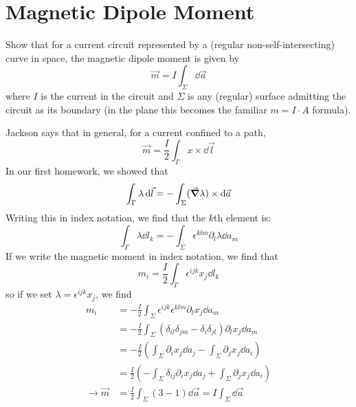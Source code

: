 \documentclass[a4paper,twoside]{article}
\begin{document}
\section{Magnetic Dipole Moment}
Show that for a current circuit represented by a (regular non-self-intersecting) curve in space, the magnetic dipole moment is given by
\begin{equation}
    \vec{m} = I \int_{\Sigma} \dd{ \vec{a}}
\end{equation}
where $ I $ is the current in the circuit and $ \Sigma $ is any (regular) surface admitting the circuit as its boundary (in the plane this becomes the familiar $ m = I \cdot A $ formula).
\begin{problem}
    Jackson says that in general, for a current confined to a path,
    \begin{equation}
        \vec{m} = \frac{I}{2} \int_{\Gamma} x \times \dd{ \vec{l}}
    \end{equation}
    In our first homework, we showed that
    \begin{equation}
        \int_{\Gamma} \lambda \dd{ \vec{l}} = -\int_{\Sigma} (\grad{\lambda}) \times \dd{ \vec{a}}
    \end{equation}
    Writing this in index notation, we find that the $ k $th element is:
    \begin{equation}
        \int_\Gamma \lambda \dd{l_k} = -\int_\Sigma \epsilon^{klm}\partial_l\lambda \dd{a_m}
    \end{equation}
    If we write the magnetic moment in index notation, we find that
    \begin{equation}
        m_i = \frac{I}{2} \int_\Gamma \epsilon^{ijk}x_j \dd{l_k}
    \end{equation}
    so if we set $ \lambda = \epsilon^{ijk}x_j $, we find
    \begin{align}
        m_i &= - \frac{I}{2} \int_\Sigma \epsilon^{ijk} \epsilon^{klm} \partial_l x_j \dd{a_m}\\
        &= - \frac{I}{2} \int_\Sigma (\delta_{il} \delta_{jm} - \delta_{\imath} \delta_{jl}) \partial_l x_j \dd{a_m}\\
        &= - \frac{I}{2} \left(\int_\Sigma \partial_i x_j \dd{a_j} - \int_\Sigma \partial_j x_j \dd{a_i} \right)\\
        &= \frac{I}{2} \left( -\int_\Sigma \delta_{ij}\partial_i x_j \dd{a_j} + \int_\Sigma \partial_j x_j \dd{a_i} \right)\\
        \rightarrow \vec{m} &= \frac{I}{2} \int_\Sigma (3-1) \dd{ \vec{a}} = I \int_\Sigma \dd{ \vec{a}}
    \end{align}
\end{problem}
\end{document}
